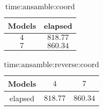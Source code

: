 \begin{table}[!ht]
	\centering
	\begin{tabular}{|c|c|}
		\hline
		Models & elapsed \\ \hline
		$4$ & $818.77$ \\ \hline
		$7$ & $860.34$ \\ \hline
	\end{tabular}
	\caption{time:ansamble:coord}
	\label{tab:time:ansamble:coord}
\end{table}

\begin{table}[!ht]
	\centering
	\begin{tabular}{|c|c|c|}
		\hline
		Models & $4$ & $7$ \\ \hline
		elapsed & $818.77$ & $860.34$ \\ \hline
	\end{tabular}
	\caption{time:ansamble:reverse:coord}
	\label{tab:time:ansamble:reverse:coord}
\end{table}

